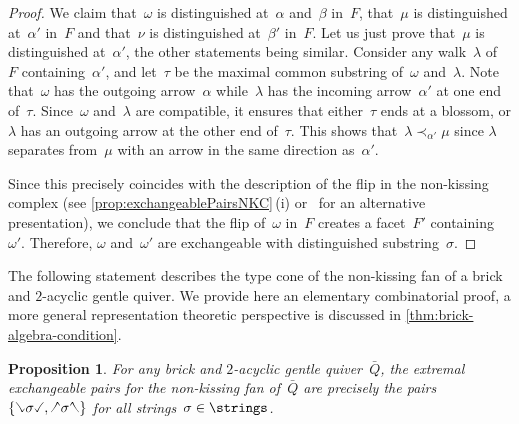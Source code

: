 \documentclass{amsart}
\newtheorem{proposition}[theorem]{Proposition}
\theoremstyle{definition}
\newcommand{\quiver}{\bar Q} %
\newcommand{\hL}{\text{\rotatebox[origin=c]{180}{\checked}}}
\newcommand{\hR}{\text{\rotatebox[origin=c]{180}{\reflectbox{\checked}}}}
\newcommand{\cL}{\text{\reflectbox{\checked}}}
\newcommand{\cR}{\text{\checked}}
\newcommand{\hh}[1]{\hL#1\hR} %
\newcommand{\cc}[1]{\cL#1\cR} %
\begin{document}
\begin{proof}
We claim that~$\omega$ is distinguished at~$\alpha$ and~$\beta$ in~$F$, that~$\mu$ is distinguished at~$\alpha'$ in~$F$ and that~$\nu$ is distinguished at~$\beta'$ in~$F$.
Let us just prove that~$\mu$ is distinguished at~$\alpha'$, the other statements being similar.
Consider any walk~$\lambda$ of~$F$ containing~$\alpha'$, and let~$\tau$ be the maximal common substring of~$\omega$ and~$\lambda$.
Note that~$\omega$ has the outgoing arrow~$\alpha$ while~$\lambda$ has the incoming arrow~$\alpha'$ at one end of~$\tau$.
Since~$\omega$ and~$\lambda$ are compatible, it ensures that either~$\tau$ ends at a blossom, or $\lambda$ has an outgoing arrow at the other end of~$\tau$.
This shows that~$\lambda \prec_{\alpha'} \mu$ since $\lambda$ separates from~$\mu$ with an arrow in the same direction as~$\alpha'$.

Since this precisely coincides with the description of the flip in the non-kissing complex (see \cref{prop:exchangeablePairsNKC}\,(i) or~\cite[Prop.~2.33]{PaluPilaudPlamondon-nonkissing} for an alternative presentation), we conclude that the flip of~$\omega$ in~$F$ creates a facet~$F'$ containing~$\omega'$.
Therefore, $\omega$ and~$\omega'$ are exchangeable with distinguished substring~$\sigma$.
\end{proof}

The following statement describes the type cone of the non-kissing fan of a brick and $2$-acyclic gentle quiver.
We provide here an elementary combinatorial proof, a more general representation theoretic perspective is discussed in \cref{thm:brick-algebra-condition}.

\begin{proposition}
\label{prop:extremalExchangeablePairsNKC}
For any brick and $2$-acyclic gentle quiver~$\quiver$, the extremal exchangeable pairs for the non-kissing fan of~$\quiver$ are precisely the pairs~$\{\cc{\sigma}, \hh{\sigma}\}$ for all strings~$\sigma \in \strings$.
\end{proposition}
\end{document}
